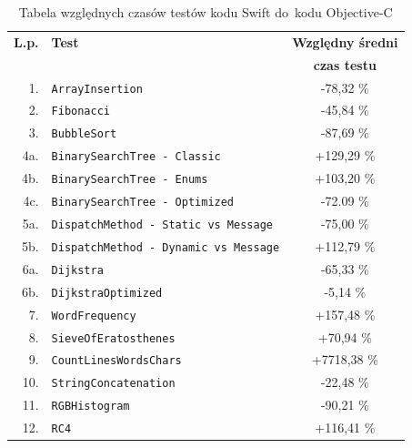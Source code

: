 \documentclass[mgr, shortabstract]{iithesis}
\begin{document}
\begin{table}[!ht]
    \begin{tabularx}{1.0\textwidth}{ rXc } 
        \hline
        \textbf{L.p.} & \textbf{Test}  & \textbf{Względny średni} \\
                        &                & \textbf{czas testu} \\
        \hline
        1. & \texttt{ArrayInsertion}                         & \textcolor{MTGreen}{-78,32 \%}    \\ 
        2. & \texttt{Fibonacci}                              & \textcolor{MTGreen}{-45,84 \%}    \\ 
        3. & \texttt{BubbleSort}                             & \textcolor{MTGreen}{-87,69 \%}    \\ 
        4a. & \texttt{BinarySearchTree - Classic }            & \textcolor{MTRed}{+129,29 \%}     \\ 
        4b. & \texttt{BinarySearchTree - Enums }              & \textcolor{MTRed}{+103,20 \%}     \\ 
        4c. & \texttt{BinarySearchTree - Optimized}           & \textcolor{MTGreen}{-72.09 \%}    \\ 
        5a. & \texttt{DispatchMethod - Static vs Message}     & \textcolor{MTGreen}{-75,00 \%}    \\ 
        5b. & \texttt{DispatchMethod - Dynamic vs Message}    & \textcolor{MTRed}{+112,79 \%}     \\ 
        6a. & \texttt{Dijkstra}                               & \textcolor{MTGreen}{-65,33 \%}    \\ 
        6b. & \texttt{DijkstraOptimized}                      & \textcolor{MTGreen}{-5,14 \%}     \\ 
        7. & \texttt{WordFrequency}                          & \textcolor{MTRed}{+157,48 \%}     \\ 
        8. & \texttt{SieveOfEratosthenes}                    & \textcolor{MTRed}{+70,94 \%}      \\ 
        9. & \texttt{CountLinesWordsChars}                   & \textcolor{MTRed}{+7718,38 \%}    \\ 
        10. & \texttt{StringConcatenation}                    & \textcolor{MTGreen}{-22,48 \%}    \\ 
        11. & \texttt{RGBHistogram}                           & \textcolor{MTGreen}{-90,21 \%}    \\ 
        12. & \texttt{RC4}                                    & \textcolor{MTRed}{+116,41 \%}     \\ 
        \hline
    \end{tabularx}
    \caption{Tabela względnych czasów testów kodu Swift do~kodu Objective-C}
    \label{t:results}
\end{table}
\end{document}
